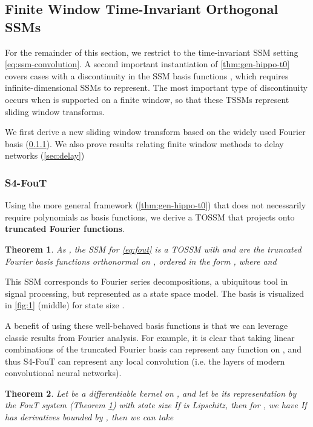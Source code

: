 \documentclass{article}
\newtheorem{theorem}{Theorem}
\begin{document}
\subsection{Finite Window Time-Invariant Orthogonal SSMs}
\label{sec:hippo:finite}


For the remainder of this section, we restrict to the time-invariant SSM setting \eqref{eq:ssm-convolution}.
 A second important instantiation of \cref{thm:gen-hippo-t0} covers cases with a discontinuity in the SSM basis functions ,
which requires infinite-dimensional SSMs to represent.
The most important type of discontinuity occurs when  is supported on a finite window, so that these TSSMs represent sliding window transforms.

We first derive a new sliding window transform based on the widely used Fourier basis (\cref{sec:fout}).
We also prove results relating finite window methods to delay networks (\cref{sec:delay})


\subsubsection{S4-FouT}
\label{sec:fout}

Using the more general framework (\cref{thm:gen-hippo-t0}) that does not necessarily require polynomials as basis functions, we derive a TOSSM that projects onto \textbf{truncated Fourier functions}.


\begin{theorem}\label{thm:hippo-fourier}
  As , the SSM for \eqref{eq:fout} is a TOSSM with 
  and  are the truncated Fourier basis functions  orthonormal on , ordered in the form , where 
  and 
\end{theorem}
This SSM corresponds to Fourier series decompositions, a ubiquitous tool in signal processing, but represented as a state space model.
The basis is visualized in \cref{fig:1} (middle) for state size .




A benefit of using these well-behaved basis functions is that we can leverage classic results from Fourier analysis.
For example, it is clear that taking linear combinations of the truncated Fourier basis can represent any function on ,
and thus S4-FouT can represent any local convolution (i.e. the layers of modern convolutional neural networks).

\begin{theorem}\label{thm:fourier-kernel-approx}
  Let  be a differentiable kernel on , and let  be its representation by the FouT system (Theorem \ref{thm:hippo-fourier}) with state size  If  is Lipschitz, then for , we have  If  has derivatives bounded by , then we can take  
\end{theorem}
\end{document}
